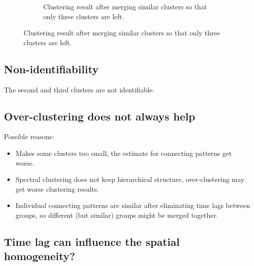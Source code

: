 \begin{figure}[H]
\begin{minipage}{0.49\textwidth}
\begin{subfigure}{\textwidth}
\caption{Clustering result after merging similar clusters so that only three clusters are left.}
\end{subfigure}
\end{minipage}
\end{figure}






\subsection*{Non-identifiability}
The second and third clusters are not identifiable.







\subsection*{Over-clustering does not always help}
Possible reasons:
\begin{itemize}
	\item Makes some clusters too small, the estimate for connecting patterns get worse.
	\item Spectral clustering does not keep hierarchical structure, over-clustering may get worse clustering results.
	\item Individual connecting patterns are similar after eliminating  time lags between groups, so different (but similar) groups might be merged together. 
\end{itemize}







\subsection*{Time lag can influence the spatial homogeneity?}

